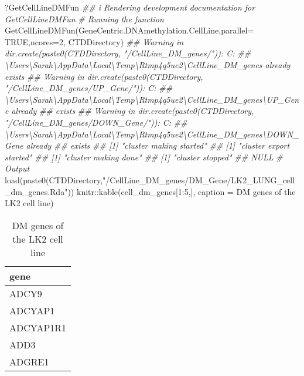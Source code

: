 \documentclass[]{article}
\newcommand{\hlnum}[1]{\textcolor[rgb]{0.816,0.125,0.439}{#1}}%
\newcommand{\hlstr}[1]{\textcolor[rgb]{0.251,0.627,0.251}{#1}}%
\newcommand{\hlcom}[1]{\textcolor[rgb]{0.502,0.502,0.502}{\textit{#1}}}%
\newcommand{\hlstd}[1]{\textcolor[rgb]{0.251,0.251,0.251}{#1}}%
\newenvironment{Shaded}{\begin{myshaded}}{\end{myshaded}}
\newcommand{\DecValTok}[1]{\hlnum{#1}}
\newcommand{\ConstantTok}[1]{\hlnum{#1}}
\newcommand{\SpecialCharTok}[1]{\hlstr{#1}}
\newcommand{\StringTok}[1]{\hlstr{#1}}
\newcommand{\CommentTok}[1]{\hlcom{#1}}
\newcommand{\DocumentationTok}[1]{\hlcom{#1}}
\newcommand{\FunctionTok}[1]{\hlstd{#1}}
\newcommand{\AttributeTok}[1]{{#1}}
\newcommand{\NormalTok}[1]{\hlstd{#1}}
\begin{document}
\begin{Shaded}
\begin{Highlighting}[]
\NormalTok{?GetCellLineDMFun}
\DocumentationTok{\#\# i Rendering development documentation for \textquotesingle{}GetCellLineDMFun\textquotesingle{}}
\CommentTok{\# Running the function}
\FunctionTok{GetCellLineDMFun}\NormalTok{(GeneCentric.DNAmethylation.CellLine,}\AttributeTok{parallel=} \ConstantTok{TRUE}\NormalTok{,}\AttributeTok{ncores=}\DecValTok{2}\NormalTok{, CTDDirectory)}
\DocumentationTok{\#\# Warning in dir.create(paste0(CTDDirectory, "/CellLine\_DM\_genes/")): \textquotesingle{}C:}
\DocumentationTok{\#\# \textbackslash{}Users\textbackslash{}Sarah\textbackslash{}AppData\textbackslash{}Local\textbackslash{}Temp\textbackslash{}Rtmp4q5ue2\textbackslash{}CellLine\_DM\_genes\textquotesingle{} already exists}
\DocumentationTok{\#\# Warning in dir.create(paste0(CTDDirectory, "/CellLine\_DM\_genes/UP\_Gene/")): \textquotesingle{}C:}
\DocumentationTok{\#\# \textbackslash{}Users\textbackslash{}Sarah\textbackslash{}AppData\textbackslash{}Local\textbackslash{}Temp\textbackslash{}Rtmp4q5ue2\textbackslash{}CellLine\_DM\_genes\textbackslash{}UP\_Gene\textquotesingle{} already}
\DocumentationTok{\#\# exists}
\DocumentationTok{\#\# Warning in dir.create(paste0(CTDDirectory, "/CellLine\_DM\_genes/DOWN\_Gene/")): \textquotesingle{}C:}
\DocumentationTok{\#\# \textbackslash{}Users\textbackslash{}Sarah\textbackslash{}AppData\textbackslash{}Local\textbackslash{}Temp\textbackslash{}Rtmp4q5ue2\textbackslash{}CellLine\_DM\_genes\textbackslash{}DOWN\_Gene\textquotesingle{} already}
\DocumentationTok{\#\# exists}
\DocumentationTok{\#\# [1] "cluster making started"}
\DocumentationTok{\#\# [1] "cluster export started"}
\DocumentationTok{\#\# [1] "cluster making done"}
\DocumentationTok{\#\# [1] "cluster stopped"}
\DocumentationTok{\#\# NULL}
\CommentTok{\# Output}
\FunctionTok{load}\NormalTok{(}\FunctionTok{paste0}\NormalTok{(CTDDirectory,}\StringTok{"/CellLine\_DM\_genes/DM\_Gene/LK2\_LUNG\_cell\_dm\_genes.Rda"}\NormalTok{))}
\NormalTok{knitr}\SpecialCharTok{::}\FunctionTok{kable}\NormalTok{(cell\_dm\_genes[}\DecValTok{1}\SpecialCharTok{:}\DecValTok{5}\NormalTok{,], }\AttributeTok{caption =} \StringTok{\textquotesingle{}DM genes of the LK2 cell line\textquotesingle{}}\NormalTok{)}
\end{Highlighting}
\end{Shaded}

\begin{table}

\caption{\label{tab:unnamed-chunk-82}DM genes of the LK2 cell line}
\centering
\begin{tabular}[t]{l}
\hline
gene\\
\hline
ADCY9\\
\hline
ADCYAP1\\
\hline
ADCYAP1R1\\
\hline
ADD3\\
\hline
ADGRE1\\
\hline
\end{tabular}
\end{table}
\end{document}
